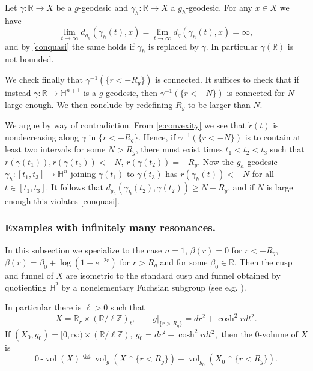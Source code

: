 \documentclass[reqno, 12pt]{amsart}
\newcommand \R {\mathbb{R}}
\newcommand \Z {\mathbb{Z}}
\newcommand \Hh {\mathbb{H}}
\newcommand \Def {\stackrel{\textrm{def}}=}
\DeclareMathOperator \vol {vol}
\theoremstyle{definition}
\numberwithin{equation}{section}
\numberwithin{prop}{section}
\numberwithin{figure}{section}
\begin{document}
Let $\gamma \colon \R \to X$ be a  $g$-geodesic and $\gamma_h \colon \R \to X$ a $g_h$-geodesic. For any $x \in X$ we have
\[\lim_{t\to\infty}d_{g_h}(\gamma_h(t),x) = \lim_{t\to\infty}d_{g}(\gamma_h(t),x) = \infty,\]
and by \eqref{conquasi} the same holds if $\gamma_h$ is replaced by $\gamma$. In particular $\gamma(\R)$ is not bounded.

We check finally that $\gamma^{-1}(\{r < -R_g\})$ is connected. It suffices to check that if instead $\gamma\colon \R \to \Hh^{n+1}$ is  a $g$-geodesic, then $\gamma^{-1}(\{r < -N\})$ is connected  for $N$  large enough. We then conclude by redefining  $R_g$ to be larger than $N$.

We argue by way of contradiction. From \eqref{e:convexity} we see that $\dot r(t)$ is nondecreasing along $\gamma$ in $\{r < -R_g\}$. Hence, if $\gamma^{-1}(\{r < - N\})$ is to contain at least two intervals for some $N> R_g$, there must exist times $t_1<t_2<t_3$ such that $r(\gamma(t_1)), r(\gamma(t_3)) < -  N$, $r(\gamma(t_2)) = -R_g$. Now the $g_h$-geodesic $\gamma_h\colon[t_1,t_3] \to \Hh^n$ joining $\gamma(t_1)$ to $\gamma(t_3)$ has $r(\gamma_h(t)) < -N$ for all $t \in [t_1,t_3]$. It follows that $d_{g_h}(\gamma_h(t_2),\gamma(t_2)) \ge N -R_g$, and if $N$ is large enough this violates \eqref{conquasi}.

\subsubsection{Examples with infinitely many resonances.}\label{infmany} In this subsection we specialize to the case $n=1$, $\beta(r) = 0$ for $r < -R_g$, $\beta(r) = \beta_0 + \log(1 + e^{-2r})$ for $r > R_g$ and for some $\beta_0 \in \R$. Then the cusp and funnel of $X$ are isometric to the standard cusp and funnel obtained by quotienting $\Hh^2$ by a nonelementary Fuchsian subgroup (see e.g. \cite[\S2.4]{b}).

In particular there is $\ell >0$ such that
\[X = \R_r \times  (\R/\ell\Z)_t, \qquad g|_{\{r > R_g\}} = dr^2 + \cosh^2r dt^2.\]
If $(X_0, g_0) = [0,\infty) \times (\R/\ell\Z), \ g_0 =  dr^2 + \cosh^2r dt^2,$ then 
the $0$-volume of $X$ is
\[0\,\textrm{-}\vol(X) \Def \vol_g(X \cap \{r < R_g\}) - \vol_{g_0}(X_0 \cap  \{r < R_g\}).\]
\end{document}
